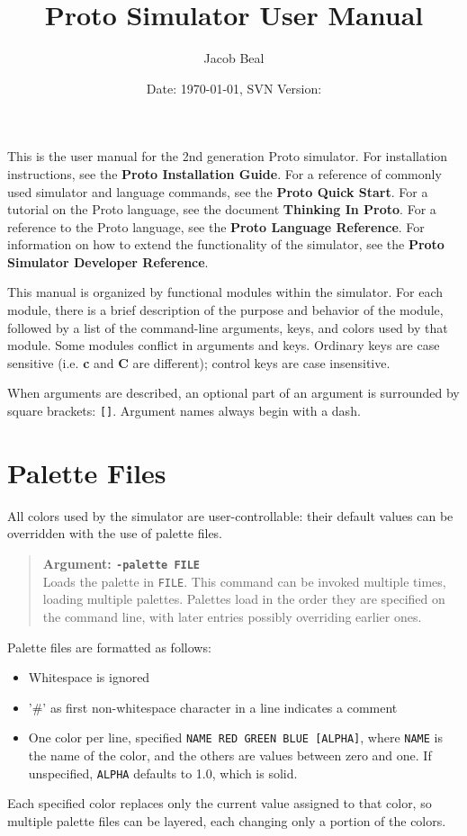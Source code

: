 \documentclass{article}
\title{Proto Simulator User Manual}
\author{Jacob Beal}
\date{Date: \today, SVN Version: \svnrev{}}
\newcommand\var[1]{{\tt #1}}
\newcommand\key[1]{{\bf #1}}
\newcommand\simarg[2]{\begin{quote} {\bf Argument: \var{#1}} \\ #2 \end{quote}}
\begin{document}
\maketitle

This is the user manual for the 2nd generation Proto simulator.  For
installation instructions, see the {\bf Proto Installation Guide}.  For
a reference of commonly used simulator and language commands, see the
{\bf Proto Quick Start}.  For a tutorial on the Proto language, see
the document {\bf Thinking In Proto}.  For a reference to the Proto
language, see the {\bf Proto Language Reference}.  For information on
how to extend the functionality of the simulator, see the {\bf Proto
Simulator Developer Reference}.

This manual is organized by functional modules within the simulator.
For each module, there is a brief description of the purpose and
behavior of the module, followed by a list of the command-line
arguments, keys, and colors used by that module.  Some modules
conflict in arguments and keys.  Ordinary keys are case sensitive
(i.e.  \key{c} and \key{C} are different); control keys are case
insensitive.

When arguments are described, an optional part of an argument is
surrounded by square brackets: \var{[]}.  Argument names always begin
with a dash.





\section{Palette Files}

All colors used by the simulator are user-controllable: their default
values can be overridden with the use of palette files.

\simarg{-palette FILE}{Loads the palette in \var{FILE}.  This
command can be invoked multiple times, loading multiple palettes.
Palettes load in the order they are specified on the command line,
with later entries possibly overriding earlier ones.}

Palette files are formatted as follows:
\begin{itemize}
\item Whitespace is ignored
\item '\#' as first non-whitespace character in a line indicates a comment
\item One color per line, specified \var{NAME RED GREEN BLUE [ALPHA]},
      where \var{NAME} is the name of the color, and the others are
      values between zero and one.  If unspecified, \var{ALPHA} defaults
      to 1.0, which is solid.
\end{itemize}
Each specified color replaces only the current value assigned to that
color, so multiple palette files can be layered, each changing only a
portion of the colors.
\end{document}
